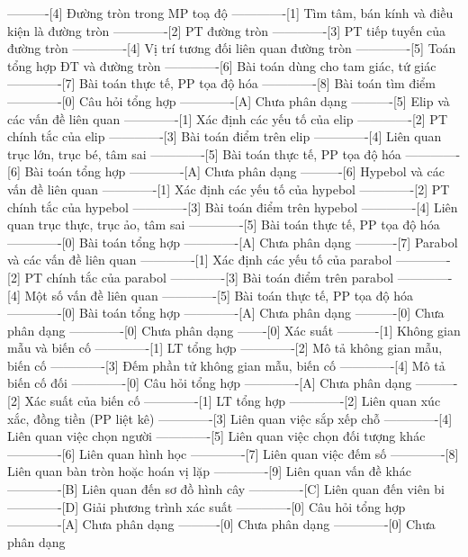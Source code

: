 ----------[4] Đường tròn trong MP toạ độ
-------------[1] Tìm tâm, bán kính và điều kiện là đường tròn
-------------[2] PT đường tròn
-------------[3] PT tiếp tuyến của đường tròn
-------------[4] Vị trí tương đối liên quan đường tròn
-------------[5] Toán tổng hợp ĐT và đường tròn
-------------[6] Bài toán dùng cho tam giác, tứ giác
-------------[7] Bài toán thực tế, PP tọa độ hóa
-------------[8] Bài toán tìm điểm
-------------[0] Câu hỏi tổng hợp
-------------[A] Chưa phân dạng
----------[5] Elip và các vấn đề liên quan
-------------[1] Xác định các yếu tố của elip
-------------[2] PT chính tắc của elip
-------------[3] Bài toán điểm trên elip
-------------[4] Liên quan trục lớn, trục bé, tâm sai
-------------[5] Bài toán thực tế, PP tọa độ hóa
-------------[6] Bài toán tổng hợp
-------------[A] Chưa phân dạng
----------[6] Hypebol và các vấn đề liên quan
-------------[1] Xác định các yếu tố của hypebol
-------------[2] PT chính tắc của hypebol
-------------[3] Bài toán điểm trên hypebol
-------------[4] Liên quan trục thực, trục ảo, tâm sai
-------------[5] Bài toán thực tế, PP tọa độ hóa
-------------[0] Bài toán tổng hợp
-------------[A] Chưa phân dạng
----------[7] Parabol và các vấn đề liên quan
-------------[1] Xác định các yếu tố của parabol
-------------[2] PT chính tắc của parabol
-------------[3] Bài toán điểm trên parabol
-------------[4] Một số vấn đề liên quan
-------------[5] Bài toán thực tế, PP tọa độ hóa
-------------[0] Bài toán tổng hợp
-------------[A] Chưa phân dạng
----------[0] Chưa phân dạng
-------------[0] Chưa phân dạng
-------[0] Xác suất
----------[1] Không gian mẫu và biến cố
-------------[1] LT tổng hợp
-------------[2] Mô tả không gian mẫu, biến cố
-------------[3] Đếm phần tử không gian mẫu, biến cố
-------------[4] Mô tả biến cố đối
-------------[0] Câu hỏi tổng hợp
-------------[A] Chưa phân dạng
----------[2] Xác suất của biến cố
-------------[1] LT tổng hợp
-------------[2] Liên quan xúc xắc, đồng tiền (PP liệt kê)
-------------[3] Liên quan việc sắp xếp chỗ
-------------[4] Liên quan việc chọn người
-------------[5] Liên quan việc chọn đối tượng khác
-------------[6] Liên quan hình học
-------------[7] Liên quan việc đếm số
-------------[8] Liên quan bàn tròn hoặc hoán vị lặp
-------------[9] Liên quan vấn đề khác
-------------[B] Liên quan đến sơ đồ hình cây
-------------[C] Liên quan đến viên bi
-------------[D] Giải phương trình xác suất
-------------[0] Câu hỏi tổng hợp
-------------[A] Chưa phân dạng
----------[0] Chưa phân dạng
-------------[0] Chưa phân dạng
